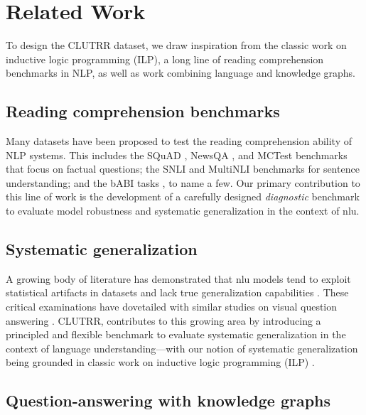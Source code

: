 \documentclass[letterpaper, 12pt]{report}
\begin{document}
\section{Related Work}
\label{sec:clutrr_related_work}

To design the CLUTRR dataset, we draw inspiration from the classic work on inductive logic programming (ILP), a long line of reading comprehension benchmarks in NLP, as well as work combining language and knowledge graphs.

\subsection{Reading comprehension benchmarks}

Many datasets have been proposed to test the reading comprehension ability of NLP systems. This includes the SQuAD \citep{rajpurkar-etal-2016-squad}, NewsQA \citep{Trischler2016-fc}, and MCTest \citep{richardson2013mctest} benchmarks that focus on factual questions; the SNLI \citep{bowman-etal-2015-large} and MultiNLI \citep{williams-etal-2018-broad} benchmarks for sentence understanding; and the bABI tasks \citep{Weston2015-is}, to name a few.
Our primary contribution to this line of work is the development of a carefully designed {\em diagnostic} benchmark to evaluate model robustness and systematic generalization in the context of \acrshort{nlu}.

\subsection{Systematic generalization}

A growing body of literature has demonstrated that \acrshort{nlu} models tend to exploit statistical artifacts in datasets and lack true generalization capabilities \citep{jia-liang-2017-adversarial,gururangan-etal-2018-annotation, kaushik2018much,Lake2018:SCAN}.
These critical examinations have dovetailed with similar studies on visual question answering \citep{agrawal2016analyzing,bahdanau2018systematic,Johnson2016-mw}.
CLUTRR, contributes to this growing area by introducing a principled and flexible benchmark to evaluate systematic generalization in the context of language understanding---with our notion of systematic generalization being grounded in classic work on inductive logic programming (ILP) \cite{Quinlan1990-iv}.


\subsection{Question-answering with knowledge graphs}
\end{document}
